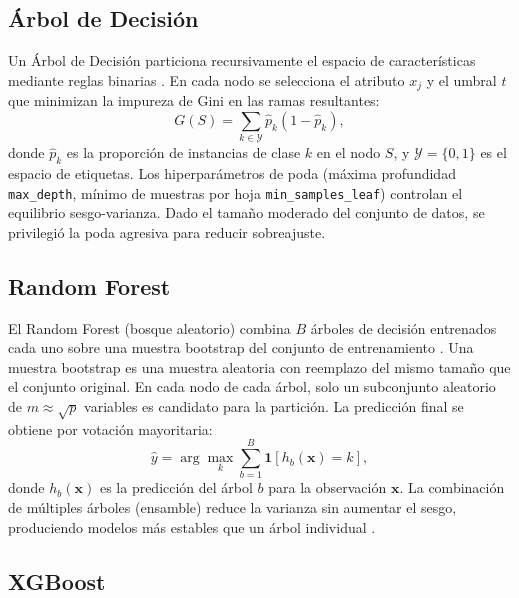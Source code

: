 \documentclass[12pt, letterpaper, openany]{report}
\begin{document}
\subsection{Árbol de Decisión}

Un Árbol de Decisión particiona recursivamente el espacio de características mediante reglas binarias \cite{Breiman1984CART}. En cada nodo se selecciona el atributo $x_j$ y el umbral $t$ que minimizan la impureza de Gini en las ramas resultantes:
\begin{equation}
  G(S) = \sum_{k \in \mathcal{Y}} \hat{p}_k (1 - \hat{p}_k),
\end{equation}
donde $\hat{p}_k$ es la proporción de instancias de clase $k$ en el nodo $S$, y $\mathcal{Y} = \{0,1\}$ es el espacio de etiquetas. Los hiperparámetros de poda (máxima profundidad \texttt{max\_depth}, mínimo de muestras por hoja \texttt{min\_samples\_leaf}) controlan el equilibrio sesgo-varianza. Dado el tamaño moderado del conjunto de datos, se privilegió la poda agresiva para reducir sobreajuste.

\subsection{Random Forest}

El Random Forest (bosque aleatorio) combina $B$ árboles de decisión entrenados cada uno sobre una muestra bootstrap del conjunto de entrenamiento \cite{Breiman2001}. Una muestra bootstrap es una muestra aleatoria con reemplazo del mismo tamaño que el conjunto original. En cada nodo de cada árbol, solo un subconjunto aleatorio de $m \approx \sqrt{p}$ variables es candidato para la partición. La predicción final se obtiene por votación mayoritaria:
\begin{equation}
  \hat{y} = \arg\max_{k} \sum_{b=1}^{B} \mathbf{1}[h_b(\mathbf{x}) = k],
\end{equation}
donde $h_b(\mathbf{x})$ es la predicción del árbol $b$ para la observación $\mathbf{x}$. La combinación de múltiples árboles (ensamble) reduce la varianza sin aumentar el sesgo, produciendo modelos más estables que un árbol individual \cite{Breiman2001}.

\subsection{XGBoost}
\end{document}
